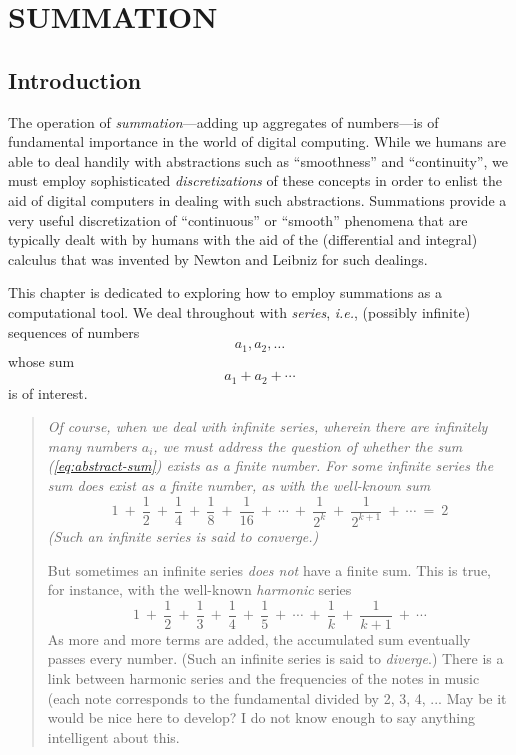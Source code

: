 
\chapter{SUMMATION}
\label{ch:Summation}


\section{Introduction}
\label{sec:intro}

The operation of {\it summation}---adding up aggregates of
numbers---is of fundamental importance in the world of digital
computing.  While we humans are able to deal handily with abstractions
such as ``smoothness'' and ``continuity'', we must employ
sophisticated {\em discretizations} of these concepts in order to
enlist the aid of digital computers in dealing with such abstractions.
Summations provide a very useful discretization of ``continuous'' or
``smooth'' phenomena that are typically dealt with by humans with the
aid of the (differential and integral) calculus that was invented by
Newton and Leibniz for such dealings.

This chapter is dedicated to exploring how to employ summations as a
computational tool.  We deal throughout with {\it series}, {\it i.e.},
(possibly infinite) sequences of numbers
\[ a_1, a_2, \ldots \]
whose sum
\begin{equation}
\label{eq:abstract-sum}
a_1 + a_2 + \cdots
\end{equation}
is of interest.
\begin{quote}
{\em Of course, when we deal with {\em infinite} series, wherein there
  are infinitely many numbers $a_i$, we must address the question of
  whether the sum (\ref{eq:abstract-sum}) exists as a finite number.
  For some infinite series the sum {\em does} exist as a finite
  number, as with the well-known sum
\[ 1 \ + \ \frac{1}{2} \ + \ \frac{1}{4} \ + \ \frac{1}{8} \ +
\ \frac{1}{16} \ + \ \cdots \ + \ \frac{1}{2^k}  \ +
\ \frac{1}{2^{k+1}} \ + \ \cdots \ = \ 2 
\]
(Such an infinite series is said to {\em converge}.)

But sometimes an infinite series {\em does not} have a finite
  sum.  This is true, for instance, with the well-known {\it harmonic}
  series 
\[ 1 \ + \ \frac{1}{2} \ + \ \frac{1}{3} \ + \ \frac{1}{4} \ +
\ \frac{1}{5} \ + \ \cdots \ + \ \frac{1}{k}  \ + \ \frac{1}{k+1} \ +
\ \cdots
\]
As more and more terms are added, the accumulated sum eventually
passes every number.  (Such an infinite series is said to {\em diverge}.)
{\Denis There is a link between harmonic series and the frequencies of the notes in music (each note corresponds to the fundamental divided by 2, 3, 4, ...
May be it would be nice here to develop?}
{\Arny I do not know enough to say anything intelligent about this.}
}
\end{quote}

